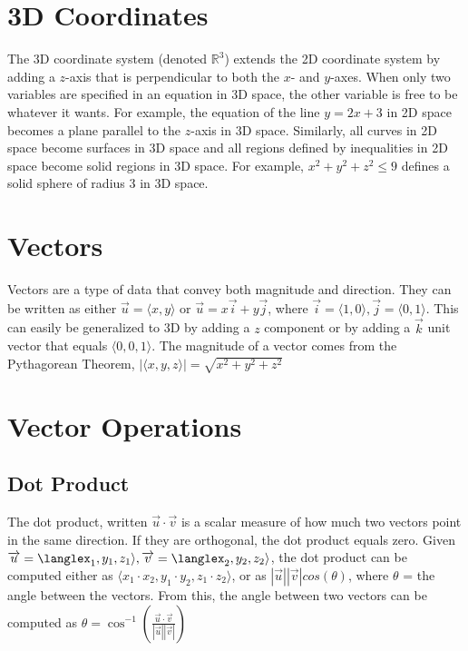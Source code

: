 \section{3D Coordinates}

The 3D coordinate system (denoted $\mathbb{R}^3$) extends the 2D coordinate system by adding a $z$-axis that is perpendicular to both the $x$- and $y$-axes. When only two variables are specified in an equation in 3D space, the other variable is free to be whatever it wants. For example, the equation of the line $y = 2x + 3$ in 2D space becomes a plane parallel to the $z$-axis in 3D space. Similarly, all curves in 2D space become surfaces in 3D space and all regions defined by inequalities in 2D space become solid regions in 3D space. For example, $x^2 + y^2 + z^2 \leq 9$ defines a solid sphere of radius 3 in 3D space.

\section{Vectors}

Vectors are a type of data that convey both magnitude and direction. They can be written as either $\overrightarrow{u} = \langle x, y\rangle$ or $\overrightarrow{u} = x\overrightarrow{i} + y\overrightarrow{j}$, where $\overrightarrow{i} = \langle1, 0\rangle, \overrightarrow{j} = \langle0, 1\rangle$. This can easily be generalized to 3D by adding a $z$ component or by adding a $\overrightarrow{k}$ unit vector that equals $\langle0, 0, 1\rangle$. The magnitude of a vector comes from the Pythagorean Theorem, $|\langle x, y, z\rangle| = \sqrt{x^2 + y^2 + z^2}$

\section{Vector Operations}

\subsection{Dot Product}
The dot product, written $\overrightarrow{u} \cdot \overrightarrow{v}$ is a scalar measure of how much two vectors point in the same direction. If they are orthogonal, the dot product equals zero. Given $\overrightarrow{u} = \langlex_1, y_1, z_1\rangle, \overrightarrow{v} = \langlex_2, y_2, z_2\rangle$, the dot product can be computed either as $\langle x_1 \cdot x_2, y_1 \cdot y_2, z_1 \cdot z_2\rangle$, or as $|\overrightarrow{u}||\overrightarrow{v}|cos(\theta)$, where $\theta$ = the angle between the vectors. From this, the angle between two vectors can be computed as $\theta = \cos^{-1}(\frac{\overrightarrow{u} \cdot \overrightarrow{v}}{|\overrightarrow{u}||\overrightarrow{v}|})$
